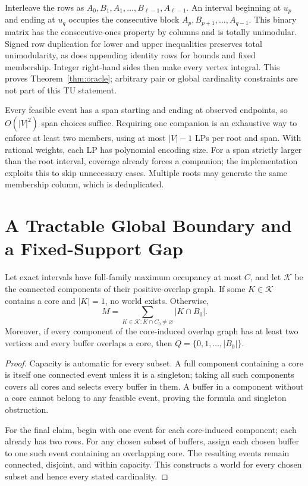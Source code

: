 Interleave the rows as $A_0,B_1,A_1,\ldots,B_{\ell-1},A_{\ell-1}$.
An interval beginning at $u_p$ and ending at $u_q$ occupies the consecutive
block $A_p,B_{p+1},\ldots,A_{q-1}$. This binary matrix has the consecutive-ones
property by columns and is totally unimodular. Signed row duplication for
lower and upper inequalities preserves total unimodularity, as does appending
identity rows for bounds and fixed membership. Integer right-hand sides then
make every vertex integral. This proves Theorem~\ref{thm:oracle}; arbitrary
pair or global cardinality constraints are not part of this TU statement.

Every feasible event has a span starting and ending at observed endpoints,
so $O(|V|^2)$ span choices suffice. Requiring one companion is an exhaustive
way to enforce at least two members, using at most $|V|-1$ LPs per root and
span. With rational weights, each LP has polynomial encoding size. For a span
strictly larger than the root interval, coverage already forces a companion;
the implementation exploits this to skip unnecessary cases. Multiple roots
may generate the same membership column, which is deduplicated.

\section{A Tractable Global Boundary and a Fixed-Support Gap}
\begin{proposition}
\label{prop:lowdepth}
Let exact intervals have full-family maximum occupancy at most $C$, and let
$\mathcal K$ be the connected components of their positive-overlap graph. If
some $K\in\mathcal K$ contains a core and $|K|=1$, no world exists. Otherwise,
\[
 M=\sum_{K\in\mathcal K:K\cap C_0\ne\varnothing}|K\cap B_0|.
\]
Moreover, if every component of the core-induced overlap graph has at least
two vertices and every buffer overlaps a core, then
$Q=\{0,1,\ldots,|B_0|\}$.
\end{proposition}

\begin{proof}
Capacity is automatic for every subset. A full component containing a core is
itself one connected event unless it is a singleton; taking all such
components covers all cores and selects every buffer in them. A buffer in a
component without a core cannot belong to any feasible event, proving the
formula and singleton obstruction.

For the final claim, begin with one event for each core-induced component;
each already has two rows. For any chosen subset of buffers, assign each
chosen buffer to one such event containing an overlapping core. The resulting
events remain connected, disjoint, and within capacity. This constructs a
world for every chosen subset and hence every stated cardinality.
\end{proof}


